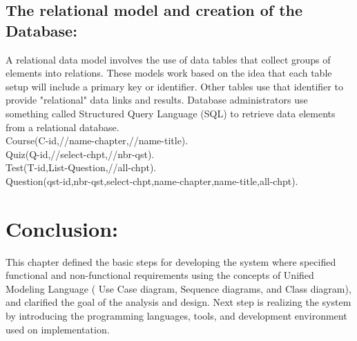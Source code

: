 \subsection{The relational model and creation of the Database:}

A relational data model involves the use of data tables that collect groups of elements into relations. These models work based on the idea that each table setup will include a primary key or identifier. Other tables use that identifier to provide "relational" data links and results. Database administrators use something called Structured Query Language (SQL) to retrieve data elements from a relational database.\cite{Techopedia-relational-model} \\
Course(C-id,//name-chapter,//name-title).\\
Quiz(Q-id,//select-chpt,//nbr-qst).\\
Test(T-id,List-Question,//all-chpt).\\
Question(qst-id,nbr-qst,select-chpt,name-chapter,name-title,all-chpt).\\


\section{Conclusion:}
This chapter defined the basic steps for developing the system where specified functional and
non-functional requirements using the concepts of Unified Modeling Language ( Use Case
diagram, Sequence diagrams, and Class diagram), and clarified the goal of the analysis and
design. Next step is realizing the system
by introducing the programming languages, tools, and development environment used on
implementation.\\







